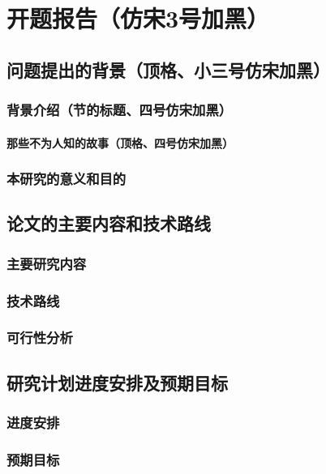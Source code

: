 \chapter{开题报告（仿宋3号加黑）}

\section{问题提出的背景（顶格、小三号仿宋加黑）}

\subsection{背景介绍（节的标题、四号仿宋加黑）}

\subsubsection{那些不为人知的故事（顶格、四号仿宋加黑）}

\subsection{本研究的意义和目的}

\section{论文的主要内容和技术路线}

\subsection{主要研究内容}

\subsection{技术路线}

\subsection{可行性分析}

\section{研究计划进度安排及预期目标}

\cite{small}

\subsection{进度安排}

\subsection{预期目标}


\parencite{big}

\printbibliography[heading=secbib]